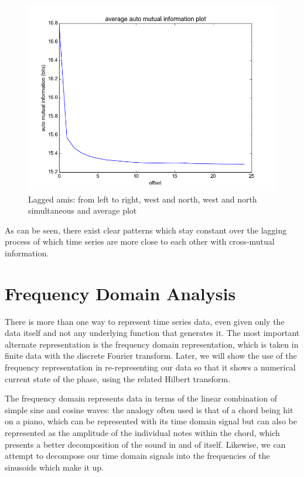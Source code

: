 \documentclass[12pt]{article}
\begin{document}
\begin{figure}
\begin{center}
    \includegraphics[scale=0.4]{norths_ami_summary}
  \end{center}
  \caption{Lagged amis: from left to right, west and north, west and north simultaneous and average plot}
\end{figure}

As can be seen, there exist clear patterns which stay constant over the lagging process of which time series are more close to each other with cross-mutual information.


\section{Frequency Domain Analysis}

There is more than one way to represent time series data, even given only the data itself and not any underlying function that generates it. The most important alternate representation is the frequency domain representation, which is taken in finite data with the discrete Fourier transform. Later, we will show the use of the frequency representation in re-representing our data so that it shows a numerical current state of the phase, using the related Hilbert transform.

The frequency domain represents data in terms of the linear combination of simple sine and cosine waves: the analogy often used is that of a chord being hit on a piano, which can be represented with its time domain signal but can also be represented as the amplitude of the individual notes within the chord, which presents a better decomposition of the sound in and of itself. Likewise, we can attempt to decompose our time domain signals into the frequencies of the sinusoids which make it up.
\end{document}
